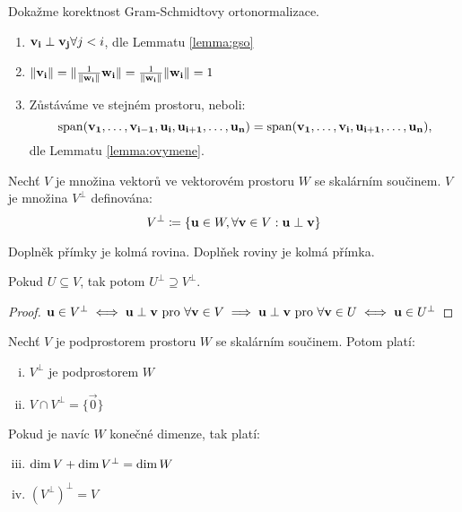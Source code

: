 \begin{remark}
    Dokažme korektnost Gram-Schmidtovy ortonormalizace.
    \begin{enumerate}
        \item $\mathbf{v_i} \perp \mathbf{v_j} \forall j < i$, dle Lemmatu \ref{lemma:gso}
        \item $\|\mathbf{v_i}\| = \|\frac{1}{\|\mathbf{w_i}\|}\mathbf{w_i}\| 
            = \frac{1}{\|\mathbf{w_i}\|}\|\mathbf{w_i}\| = 1$
        \item Zůstáváme ve stejném prostoru, neboli: $$\mathop{\mathrm{span}}(\mathbf{v_1}, \dots, 
        \mathbf{v_{i-1}}, \mathbf{u_i}, \mathbf{u_{i+1}}, \dots, \mathbf{u_n}) 
        = \mathop{\mathrm{span}}(\mathbf{v_1}, \dots, \mathbf{v_i}, \mathbf{u_{i+1}}, \dots, \mathbf{u_n}),$$ dle 
        Lemmatu \ref{lemma:ovymene}.
    \end{enumerate}
\end{remark}

\begin{definition}
    Nechť $V$ je množina vektorů ve vektorovém prostoru $W$ se skalárním
    součinem.  $V$ je množina $V^\bot$ 
    definována:
    $$V^\bot \coloneqq \{\mathbf{u} \in W, \forall \mathbf{v} \in V: \mathbf{u} \perp \mathbf{v} \}$$
\end{definition}

\begin{remark}
    Doplněk přímky je kolmá rovina. Doplňek roviny je kolmá přímka.
\end{remark}

\begin{observation}
    Pokud $U \subseteq V$, tak potom $U^\bot \supseteq V^\bot$.
\end{observation}

\begin{proof}
    $\mathbf{u} \in V^\bot \iff \mathbf{u} \perp \mathbf{v} \text{ pro } \forall \mathbf{v} \in V \implies
    \mathbf{u} \perp \mathbf{v} \text{ pro } \forall \mathbf{v} \in U \iff \mathbf{u} \in U^\bot$
\end{proof}

\begin{theorem}
    Nechť $V$ je podprostorem prostoru $W$ se skalárním součinem. Potom platí:
    \begin{enumerate}[i.]
        \item $V^\bot$ je podprostorem $W$
        \item $V \cap V^\bot = \{\vec{0}\}$
    \end{enumerate}
    Pokud je navíc $W$ konečné dimenze, tak platí:
    \begin{enumerate}[i.]
        \setcounter{enumi}{2}
        \item $\mathop{\mathrm{dim}} V + \mathop{\mathrm{dim}} V^\bot = \mathop{\mathrm{dim}} W$
        \item $(V^\bot)^\bot = V$
    \end{enumerate}
\end{theorem}

